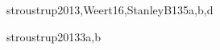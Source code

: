 \begin{syllabus}
\begin{unit}{\SDFAlgorithmsandDesign}{}{stroustrup2013,Weert16,StanleyB13}{5}{a,b,d}
\begin{topics}
	\item \SDFAlgorithmsandDesignTopicThe
	\item \SDFAlgorithmsandDesignTopicTheRole
	\item \SDFAlgorithmsandDesignTopicProblem
	\item \SDFAlgorithmsandDesignTopicFundamental
\end{topics}

\begin{learningoutcomes}
	\item \SDFAlgorithmsandDesignLODiscussTheAlgorithms [\Usage]
	\item \SDFAlgorithmsandDesignLODiscussHowMay [\Usage]
	\item \SDFAlgorithmsandDesignLOCreateAlgorithms [\Usage]
	\item \SDFAlgorithmsandDesignLOUseAToAnd [\Usage]
	\item \SDFAlgorithmsandDesignLOImplementTest [\Usage]
	\item \SDFAlgorithmsandDesignLODetermineWhetherOr [\Usage]
	\item \SDFAlgorithmsandDesignLOImplementAConquer [\Usage]
	\item \SDFAlgorithmsandDesignLOApplyTheDecomposition [\Usage]
	\item \SDFAlgorithmsandDesignLOIdentifyTheAnd [\Usage]
	\item \SDFAlgorithmsandDesignLOImplementAData [\Usage]
	\item \SDFAlgorithmsandDesignLOIdentifyTheAndMultiple [\Usage]
\end{learningoutcomes}
\end{unit}

\begin{unit}{\ALBasicAnalysis}{}{stroustrup2013}{3}{a,b}
\begin{topics}
	\item \ALBasicAnalysisTopicDifferences
	\item \ALBasicAnalysisTopicAsymptotic
	\item \ALBasicAnalysisTopicBig
	\item \ALBasicAnalysisTopicComplexity
	\item \ALBasicAnalysisTopicEmpirical
	\item \ALBasicAnalysisTopicTime
	\item \ALBasicAnalysisTopicBigO
	\item \ALBasicAnalysisTopicLittle
	\item \ALBasicAnalysisTopicRecurrence
	\item \ALBasicAnalysisTopicAnalysis
	\item \ALBasicAnalysisTopicSome
\end{topics}


\end{unit}
\end{syllabus}
